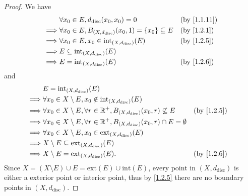 \begin{proof}
  We have
  \begin{align*}
             & \forall x_0 \in E, d_{\text{disc}}(x_0, x_0) = 0                          &  & \text{(by \cref{1.1.11})} \\
    \implies & \forall x_0 \in E, B_{(X, d_{\text{disc}})}(x_0, 1) = \{x_0\} \subseteq E &  & \text{(by \cref{1.2.1})}  \\
    \implies & \forall x_0 \in E, x_0 \in \text{int}_{(X, d_{\text{disc}})}(E)           &  & \text{(by \cref{1.2.5})}  \\
    \implies & E \subseteq \text{int}_{(X, d_{\text{disc}})}(E)                                                         \\
    \implies & E = \text{int}_{(X, d_{\text{disc}})}(E)                                  &  & \text{(by \cref{1.2.6})}
  \end{align*}
  and
  \begin{align*}
             & E = \text{int}_{(X, d_{\text{disc}})}(E)                                                                                             \\
    \implies & \forall x_0 \in X \setminus E, x_0 \notin \text{int}_{(X, d_{\text{disc}})}(E)                                                       \\
    \implies & \forall x_0 \in X \setminus E, \forall r \in \R^+, B_{(X, d_{\text{disc}})}(x_0, r) \not\subseteq E    &  & \text{(by \cref{1.2.5})} \\
    \implies & \forall x_0 \in X \setminus E, \forall r \in \R^+, B_{(X, d_{\text{disc}})}(x_0, r) \cap E = \emptyset                               \\
    \implies & \forall x_0 \in X \setminus E, x_0 \in \text{ext}_{(X, d_{\text{disc}})}(E)                                                          \\
    \implies & X \setminus E \subseteq \text{ext}_{(X, d_{\text{disc}})}(E)                                                                         \\
    \implies & X \setminus E = \text{ext}_{(X, d_{\text{disc}})}(E).                                                  &  & \text{(by \cref{1.2.6})}
  \end{align*}
  Since \(X = (X \setminus E) \cup E = \text{ext}(E) \cup \text{int}(E)\), every point in \((X, d_{\text{disc}})\) is either a exterior point or interior point, thus by \cref{1.2.5} there are no boundary points in \((X, d_{\text{disc}})\).
\end{proof}

